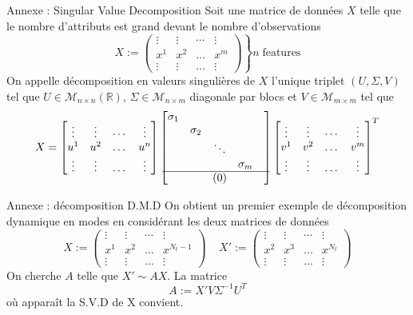 \documentclass{beamer}
\begin{document}
\begin{frame}{Annexe : Singular Value Decomposition}
    Soit une matrice de données $X$ telle que le nombre d'attributs est grand devant le nombre d'observations $$ X := \left. \begin{pmatrix} \vdots & \vdots & \cdots & \vdots \\ x^1 & x^2 & \dots & x^m \\ \vdots & \vdots & \dots & \vdots \end{pmatrix} \right\} n \; \text{features} $$
    On appelle décomposition en valeurs singulières de $X$ l'unique triplet $(U, \Sigma, V)$ tel que $U \in \mathcal{M
    }_{n \times n}(\mathbb{R})$, $\Sigma \in \mathcal{M}_{n \times m}$ diagonale par blocs et $V \in \mathcal{M}_{m \times m}$ tel que
    \begin{equation*}
        X = 
        \begin{bmatrix} 
            \vdots & \vdots & \cdots & \vdots \\
            u^1    & u^2    & \dots  & u^n    \\ 
            \vdots & \vdots & \dots & \vdots
        \end{bmatrix}
        \begin{bmatrix}
            \sigma_1 & & & \\
            & \sigma_2 & & \\
            & & \ddots &   \\
            & & & \sigma_m \\
            \hline
            & & (0) & &
        \end{bmatrix}
        \begin{bmatrix}
            \vdots & \vdots & \cdots & \vdots \\
            v^1    & v^2    & \dots  & v^m    \\ 
            \vdots & \vdots & \dots & \vdots
        \end{bmatrix}^T
    \end{equation*}
\end{frame}

\begin{frame}{Annexe : décomposition D.M.D}
    On obtient un premier exemple de décomposition dynamique en modes en considérant les deux matrices de données 
    $$ X := \begin{pmatrix} \vdots & \vdots & \cdots & \vdots \\ x^1 & x^2 & \dots & x^{N_t-1} \\ \vdots & \vdots & \dots & \vdots \end{pmatrix} \;\;\;\; X' := \begin{pmatrix} \vdots & \vdots & \cdots & \vdots \\ x^2 & x^3 & \dots & x^{N_t} \\ \vdots & \vdots & \dots & \vdots \end{pmatrix} $$ On cherche $A$ telle que $X' \sim A X$. La matrice
    \begin{equation*}
        A := X' V \Sigma^{-1} U^T
    \end{equation*}
    où apparaît la S.V.D de X convient.
\end{frame}
\end{document}
